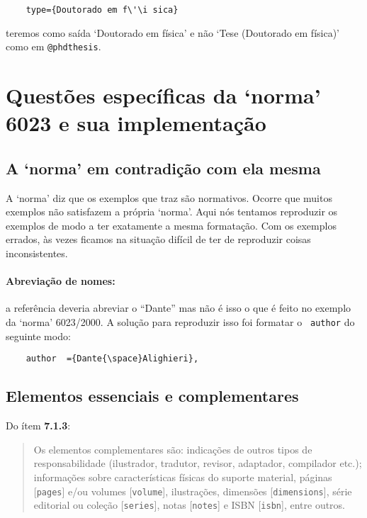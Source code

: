 \documentclass[a4paper]{ltxdoc}
\begin{document}
\begin{verbatim}
    type={Doutorado em f\'\i sica}
\end{verbatim}

teremos como saída `Doutorado em física' e não `Tese (Doutorado em física)' como
em {\tt @phdthesis}.




\appendix

\section{Questões específicas da `norma' 6023 e sua implementação}

\subsection{A `norma' em contradição com ela mesma}

A `norma' diz que os exemplos que traz são normativos. Ocorre que muitos
exemplos não satisfazem a própria `norma'. Aqui nós tentamos reproduzir os
exemplos de modo a ter exatamente a mesma formatação. Com os exemplos errados,
às vezes ficamos na situação difícil de ter de reproduzir coisas inconsistentes.

\paragraph{Abreviação de nomes:} a referência  deveria
abreviar o ``Dante'' mas não é isso o que é feito no exemplo da `norma'
6023/2000\cite{NBR6023:2000}. A solução para reproduzir isso foi formatar o {\tt
author} do seguinte modo:

\begin{verbatim}
    author  ={Dante{\space}Alighieri},
\end{verbatim}

\subsection{Elementos essenciais e complementares}

Do ítem {\bf 7.1.3}\cite{NBR6023:2000}:

\begin{quote}
Os elementos complementares são: indicações de outros tipos de responsabilidade
(ilustrador, tradutor, revisor, adaptador, compilador etc.);
informações sobre características físicas do suporte material, páginas
[{\tt pages}] e/ou
volumes [{\tt volume}], ilustrações,
dimensões [{\tt dimensions}]\cite{7.1.3-1,7.1.3-2},
série editorial ou coleção [{\tt series}], notas [{\tt notes}] e
ISBN [{\tt isbn}]\cite{7.1.3-1,7.1.3-2}, entre outros.
\end{quote}
\end{document}
